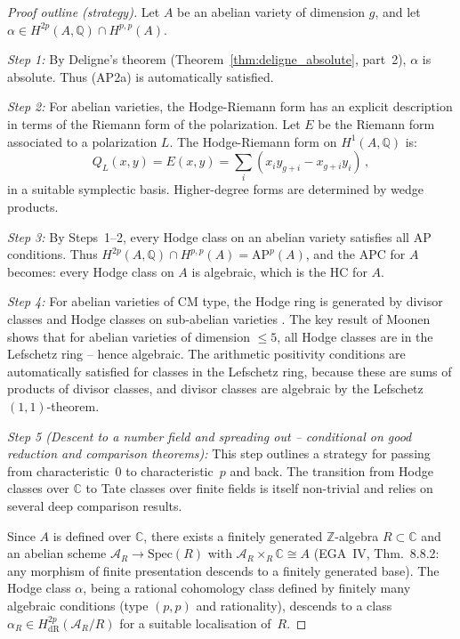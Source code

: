 \documentclass[aps,prd,twocolumn,superscriptaddress,nofootinbib]{revtex4-2}
\theoremstyle{definition}
\theoremstyle{remark}
\begin{document}
\begin{proof}[Proof outline (strategy)]
Let $A$ be an abelian variety of dimension $g$, and let $\alpha \in H^{2p}(A, \mathbb{Q}) \cap H^{p,p}(A)$.

\textit{Step 1:} By Deligne's theorem (Theorem~\ref{thm:deligne_absolute}, part~2), $\alpha$ is absolute. Thus (AP2a) is automatically satisfied.

\textit{Step 2:} For abelian varieties, the Hodge-Riemann form has an explicit description in terms of the Riemann form of the polarization. Let $E$ be the Riemann form associated to a polarization $L$. The Hodge-Riemann form on $H^1(A, \mathbb{Q})$ is:
\begin{equation}
Q_L(x, y) = E(x, y) = \sum_{i} (x_i y_{g+i} - x_{g+i} y_i)\,,
\end{equation}
in a suitable symplectic basis. Higher-degree forms are determined by wedge products.

\textit{Step 3:} By Steps~1--2, every Hodge class on an abelian variety satisfies all AP conditions. Thus $H^{2p}(A, \mathbb{Q}) \cap H^{p,p}(A) = \mathrm{AP}^p(A)$, and the APC for $A$ becomes: every Hodge class on $A$ is algebraic, which is the HC for $A$.

\textit{Step 4:} For abelian varieties of CM type, the Hodge ring is generated by divisor classes and Hodge classes on sub-abelian varieties \cite{Abdulali1994}. The key result of Moonen \cite{Moonen1999} shows that for abelian varieties of dimension $\leq 5$, all Hodge classes are in the Lefschetz ring -- hence algebraic. The arithmetic positivity conditions are automatically satisfied for classes in the Lefschetz ring, because these are sums of products of divisor classes, and divisor classes are algebraic by the Lefschetz $(1,1)$-theorem.

\textit{Step 5 (Descent to a number field and spreading out -- conditional on good reduction and comparison theorems):} This step outlines a strategy for passing from characteristic~$0$ to characteristic~$p$ and back. The transition from Hodge classes over $\mathbb{C}$ to Tate classes over finite fields is itself non-trivial and relies on several deep comparison results.

Since $A$ is defined over $\mathbb{C}$, there exists a finitely generated $\mathbb{Z}$-algebra $R \subset \mathbb{C}$ and an abelian scheme $\mathcal{A}_R \to \mathrm{Spec}(R)$ with $\mathcal{A}_R \times_R \mathbb{C} \cong A$ (EGA~IV, Thm.\ 8.8.2: any morphism of finite presentation descends to a finitely generated base). The Hodge class $\alpha$, being a rational cohomology class defined by finitely many algebraic conditions (type $(p,p)$ and rationality), descends to a class $\alpha_R \in H^{2p}_{\mathrm{dR}}(\mathcal{A}_R/R)$ for a suitable localisation of~$R$.


\end{proof}
\end{document}
